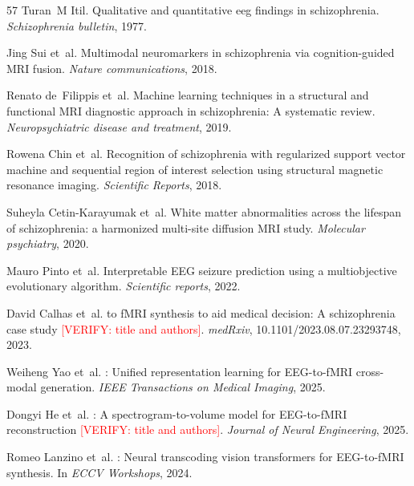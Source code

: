 \documentclass{article}
\newcommand{\verify}[1]{\textcolor{red}{[VERIFY: #1]}}
\begin{document}
\begin{thebibliography}{57}
Turan~M Itil.
\newblock Qualitative and quantitative eeg findings in schizophrenia.
\newblock \emph{Schizophrenia bulletin}, 1977.

Jing Sui et~al.
\newblock Multimodal neuromarkers in schizophrenia via cognition-guided {MRI} fusion.
\newblock \emph{Nature communications}, 2018.

Renato de~Filippis et~al.
\newblock Machine learning techniques in a structural and functional {MRI} diagnostic approach in schizophrenia: {A} systematic review.
\newblock \emph{Neuropsychiatric disease and treatment}, 2019.

Rowena Chin et~al.
\newblock Recognition of schizophrenia with regularized support vector machine and sequential region of interest selection using structural magnetic resonance imaging.
\newblock \emph{Scientific Reports}, 2018.

Suheyla Cetin-Karayumak et~al.
\newblock White matter abnormalities across the lifespan of schizophrenia: a harmonized multi-site diffusion {MRI} study.
\newblock \emph{Molecular psychiatry}, 2020.

Mauro Pinto et~al.
\newblock Interpretable {EEG} seizure prediction using a multiobjective evolutionary algorithm.
\newblock \emph{Scientific reports}, 2022.


David Calhas et~al.
 to {fMRI} synthesis to aid medical decision: {A} schizophrenia case study \verify{title and authors}.
\newblock \emph{medRxiv}, 10.1101/2023.08.07.23293748, 2023.

Weiheng Yao et~al.
: Unified representation learning for {EEG}-to-{fMRI} cross-modal generation.
\newblock \emph{IEEE Transactions on Medical Imaging}, 2025.

Dongyi He et~al.
: A spectrogram-to-volume model for {EEG}-to-{fMRI} reconstruction \verify{title and authors}.
\newblock \emph{Journal of Neural Engineering}, 2025.

Romeo Lanzino et~al.
: Neural transcoding vision transformers for {EEG}-to-{fMRI} synthesis.
\newblock In \emph{ECCV Workshops}, 2024.


\end{thebibliography}
\end{document}
